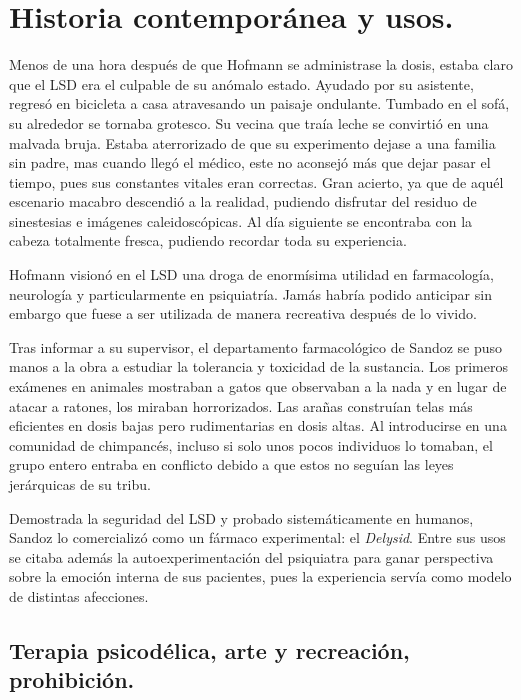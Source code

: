 \section{Historia contemporánea y usos.}

Menos de una hora después de que Hofmann se administrase la dosis, estaba claro que el LSD era el culpable de su anómalo estado. Ayudado por su asistente, regresó en bicicleta a casa atravesando un paisaje ondulante. Tumbado en el sofá, su alrededor se tornaba grotesco. Su vecina que traía leche se convirtió en una malvada bruja. Estaba aterrorizado de que su experimento dejase a una familia sin padre, mas cuando llegó el médico, este no aconsejó más que dejar pasar el tiempo, pues sus constantes vitales eran correctas. Gran acierto, ya que de aquél escenario macabro descendió a la realidad, pudiendo disfrutar del residuo de sinestesias e imágenes caleidoscópicas. Al día siguiente se encontraba con la cabeza totalmente fresca, pudiendo recordar toda su experiencia.

Hofmann visionó en el LSD una droga de enormísima utilidad en farmacología, neurología y particularmente en psiquiatría. Jamás habría podido anticipar sin embargo que fuese a ser utilizada de manera recreativa después de lo vivido.

Tras informar a su supervisor, el departamento farmacológico de Sandoz se puso manos a la obra a estudiar la tolerancia y toxicidad de la sustancia. Los primeros exámenes en animales mostraban a gatos que observaban a la nada y en lugar de atacar a ratones, los miraban horrorizados. Las arañas construían telas más eficientes en dosis bajas pero rudimentarias en dosis altas. Al introducirse en una comunidad de chimpancés, incluso si solo unos pocos individuos lo tomaban, el grupo entero entraba en conflicto debido a que estos no seguían las leyes jerárquicas de su tribu.

Demostrada la seguridad del LSD y probado sistemáticamente en humanos, Sandoz lo comercializó como un fármaco experimental: el \textit{Delysid}. Entre sus usos se citaba además la autoexperimentación del psiquiatra para ganar perspectiva sobre la emoción interna de sus pacientes, pues la experiencia servía como modelo de distintas afecciones.

\subsection{Terapia psicodélica, arte y recreación, prohibición.}

